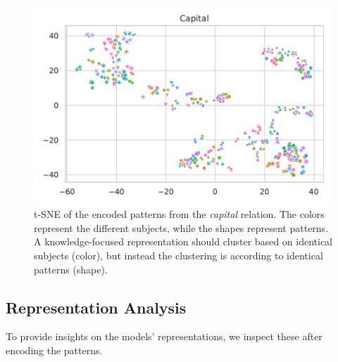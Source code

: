 \begin{figure}[t!]
\centering
\includegraphics[width=1\columnwidth]{figures/capital-bert-large}


\caption{t-SNE of the encoded patterns from the
  \textit{capital} relation. The colors
  represent the different subjects, while the shapes
  represent patterns. A knowledge-focused representation
  should cluster based on identical subjects (color), but
  instead the clustering is according to identical patterns (shape).}
\label{fig:tsne-emb}

\end{figure}

\subsection{Representation Analysis}


To provide insights on the models' representations, we inspect these after encoding the patterns.

